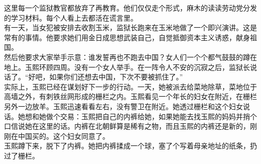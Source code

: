 这里每一个监狱教官都放弃了再教育。他们仅仅走个形式，麻木的读读劳动党分发的学习材料。每个人看上去都活在谎言里。\\

有一天，当女犯被安排去收割玉米，监狱长跑来在玉米地做了一个即兴演讲。这是常有的事情。他要求她们用金日成思想武装自己，自觉抵御资本主义诱惑，献身祖国。\\

然后他要求大家举手示意：谁发誓再也不跑去中国？女人们一个个都气鼓鼓的蹲在地上。玉熙环顾四周。没有一个女人举手。在一阵令人不安的沉寂之后，监狱长说话了。“好吧，如果你们还想去中国，下次不要被抓住了。”\\

实际上，玉熙已经在谋划好下一步的行动。一天，她被派去给菜地除草，菜地位于高墙之外，有刺铁丝网形成的栅栏之内。玉熙看见一个年长的妇女在附近，在栅栏另外一边放羊。玉熙迅速看看左右，没有警卫在附近。她透过栅栏和这个妇女说话。她想和她做个交易：玉熙把自己的内裤给她，如果她能去找玉熙的妈妈并捎个口信说她在这里的话。内裤在北朝鲜算是稀有之物，而且玉熙的内裤还是新的，刚刚在中国买的。这个妇女同意了。\\

玉熙蹲下来，脱下了内裤。她把内裤揉成一个球，塞了个写着母亲地址的纸条，扔过了栅栏。\\
